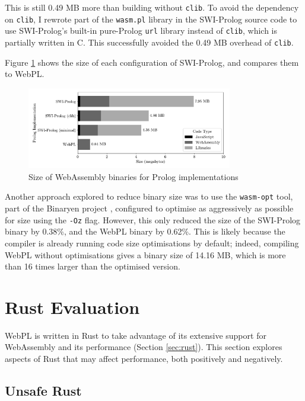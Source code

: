 This is still 0.49 MB more than building without \texttt{clib}. To avoid the dependency on \texttt{clib}, I rewrote part of the \texttt{wasm.pl} library in the SWI-Prolog source code to use SWI-Prolog's built-in pure-Prolog \texttt{url} library instead of \texttt{clib}, which is partially written in C. This successfully avoided the 0.49 MB overhead of \texttt{clib}.

Figure \ref{fig:binary-size} shows the size of each configuration of SWI-Prolog, and compares them to WebPL.

\begin{figure}[H]
\centering
\includegraphics[width=0.8\textwidth]{binary_size.pdf}
\caption{Size of WebAssembly binaries for Prolog implementations}
\label{fig:binary-size}
\end{figure}

Another approach explored to reduce binary size was to use the \texttt{wasm-opt} tool, part of the Binaryen project \cite{zakaiBinaryenhttpsgithubcom2015}, configured to optimise as aggressively as possible for size using the \texttt{-Oz} flag. However, this only reduced the size of the SWI-Prolog binary by 0.38\%, and the WebPL binary by 0.62\%. This is likely because the compiler is already running code size optimisations by default; indeed, compiling WebPL without optimisations gives a binary size of 14.16 MB, which is more than 16 times larger than the optimised version.

\section{Rust Evaluation}

\label{sec:rust-evaluation}

WebPL is written in Rust to take advantage of its extensive support for WebAssembly and its performance (Section \ref{sec:rust}). This section explores aspects of Rust that may affect performance, both positively and negatively.

\subsection{Unsafe Rust}

